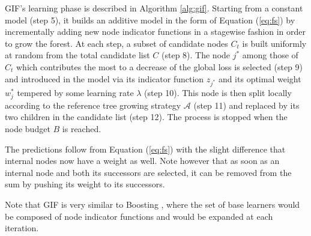\documentclass{article}
\begin{document}
GIF's learning phase is described in Algorithm \ref{alg:gif}.
Starting from a constant model (step 5), it builds an additive model in the 
form of Equation (\ref{eq:fs}) by incrementally adding new node indicator 
functions in a stagewise fashion in order to grow the forest.
At each step, a subset of candidate nodes $C_t$ is built uniformly at random 
from the total candidate list $C$ (step 8). The node $j^*$ among those of $C_t$ 
which contributes the most to a decrease of the global loss is selected (step 
9) and introduced in the model via its indicator function $z_{j^*}$ and its 
optimal weight $w^*_j$ tempered by some learning rate $\lambda$ (step 10). This 
node is then split locally according to the reference tree growing strategy 
$\mathcal{A}$ (step 11) and replaced by its two children in the candidate list 
(step 12). The process is stopped when the node budget $B$ is reached. 

The predictions follow from Equation (\ref{eq:fs}) with the slight difference
that internal nodes now have a weight as well. Note however that as soon as an
internal node and both its successors are selected, it can be removed from the
sum by pushing its weight to its successors.

Note that GIF is very similar to Boosting \cite{hastie2009}, where the set of 
base learners would be composed of node indicator functions and would be 
expanded at each iteration.
\end{document}
